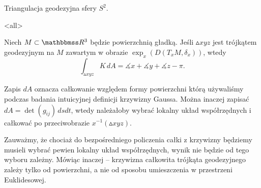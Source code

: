 \begin{frame}

\begin{przyklad}
Triangulacja geodezyjna sfery $S^2$.
\begin{center}

\end{center}
\end{przyklad}


\end{frame}
% 
\mode<all>{}
\begin{frame}[<+->]
\begin{twierdzenie}
Niech $M\subset \R^3$ będzie powierzchnią gładką. Jeśli $\vartriangle xyz$ jest trójkątem geodezyjnym na $M$ zawartym w obrazie $\exp_x(D(T_xM,\delta_x))$, wtedy
\[\int_{\vartriangle xyz} K\,dA=\measuredangle x+\measuredangle y +\measuredangle z - \pi.\]
\end{twierdzenie}
\begin{uwaga}
Zapis $dA$ oznacza całkowanie względem formy powierzchni którą używaliśmy 
podczas badania intuicyjnej definicji krzywizny Gaussa. Można inaczej zapisać 
$dA=\det(g_{ij})\,dsdt$, wtedy należałoby wybrać lokalny układ współrzędnych i 
całkować po przeciwobrazie $x^{-1}(\vartriangle 
xyz)$.

\end{uwaga}

\end{frame}
Zauważmy, że chociaż do bezpośredniego policzenia całki z krzywizny będziemy musieli wybrać pewien lokalny układ współrzędnych, wynik nie będzie od tego wyboru zależny. Mówiąc inaczej -- krzywizna całkowita trójkąta geodezyjnego zależy tylko od powierzchni, a nie od sposobu umieszczenia w przestrzeni Euklidesowej.
